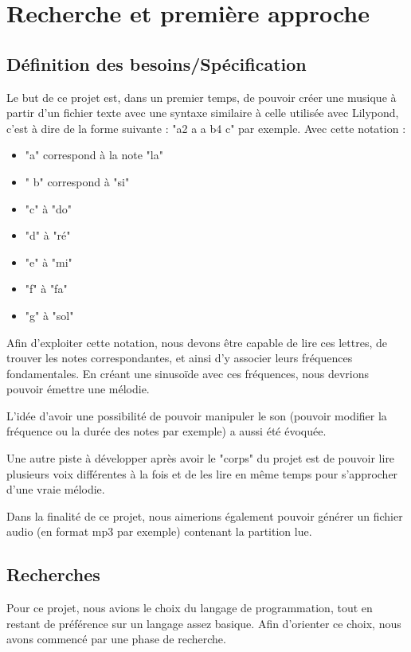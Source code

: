 \documentclass{EPUProjetPeiP}
\begin{document}
\section{Recherche et première approche}

\subsection{Définition des besoins/Spécification}

Le but de ce projet est, dans un premier temps, de pouvoir créer une musique à partir d'un fichier texte avec une syntaxe similaire à celle utilisée avec Lilypond, 
c'est à dire de la forme suivante : "a2 a a b4 c" par exemple.
Avec cette notation : 
\begin{itemize}
\item "a" correspond à la note "la"
\item " b" correspond à "si"
\item  "c" à "do"
\item "d" à "ré"
\item "e" à "mi"
\item "f" à "fa"
\item "g" à "sol"
\end{itemize}
Afin d'exploiter cette notation, nous devons être capable de lire ces lettres, de trouver les notes correspondantes, et ainsi d'y associer leurs fréquences fondamentales.
En créant une sinusoïde avec ces fréquences, nous devrions pouvoir émettre une mélodie.

L'idée d'avoir une possibilité de pouvoir manipuler le son (pouvoir modifier la fréquence ou la durée des notes par exemple) a aussi été évoquée.

Une autre piste à développer après avoir le "corps" du projet est de pouvoir lire plusieurs voix différentes à la fois et de les lire en même temps pour 
s'approcher d'une vraie mélodie.

Dans la finalité de ce projet, nous aimerions également pouvoir générer un fichier audio (en format mp3 par exemple) contenant la partition lue.


\subsection{Recherches}

Pour ce projet, nous avions le choix du langage de programmation, tout en restant de préférence sur un langage assez basique. Afin 
d'orienter ce choix, nous avons commencé par une phase de recherche.
\end{document}
